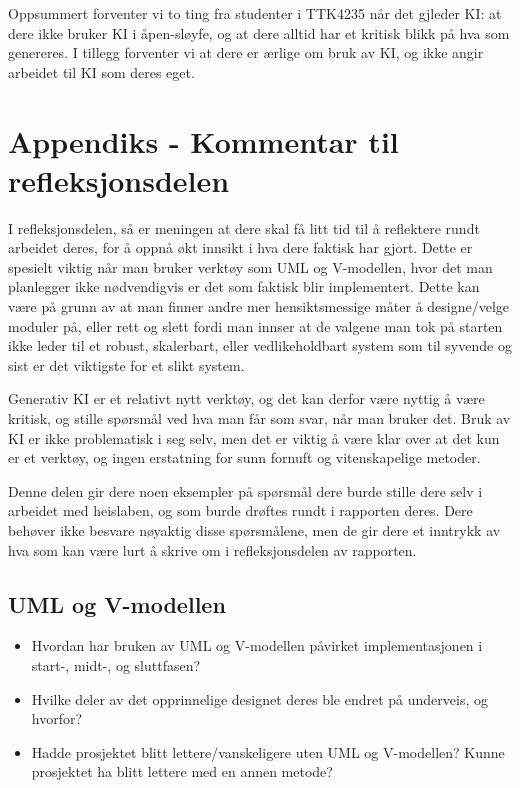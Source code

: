 Oppsummert forventer vi to ting fra studenter i TTK4235 når det gjleder KI: at dere ikke bruker KI i åpen-sløyfe, og at dere alltid har et kritisk blikk på hva som genereres. I tillegg forventer vi at dere er ærlige om bruk av KI, og ikke angir arbeidet til KI som deres eget. 

\section{Appendiks - Kommentar til refleksjonsdelen}\label{app:refleksjon}

I refleksjonsdelen, så er meningen at dere skal få litt tid til å reflektere rundt arbeidet deres, for å oppnå økt innsikt i hva dere faktisk har gjort. Dette er spesielt viktig når man bruker verktøy som UML og V-modellen, hvor det man planlegger ikke nødvendigvis er det som faktisk blir implementert. Dette kan være på grunn av at man finner andre mer hensiktsmessige måter å designe/velge moduler på, eller rett og slett fordi man innser at de valgene man tok på starten ikke leder til et robust, skalerbart, eller vedlikeholdbart system som til syvende og sist er det viktigste for et slikt system. 

Generativ KI er et relativt nytt verktøy, og det kan derfor være nyttig å være kritisk, og stille spørsmål ved hva man får som svar, når man bruker det. Bruk av KI er ikke problematisk i seg selv, men det er viktig å være klar over at det kun er et verktøy, og ingen erstatning for sunn fornuft og vitenskapelige metoder.

Denne delen gir dere noen eksempler på spørsmål dere burde stille dere selv i arbeidet med heislaben, og som burde drøftes rundt i rapporten deres. Dere behøver ikke besvare nøyaktig disse spørsmålene, men de gir dere et inntrykk av hva som kan være lurt å skrive om i refleksjonsdelen av rapporten.

\subsection{UML og V-modellen}
\begin{itemize}
    \item Hvordan har bruken av UML og V-modellen påvirket implementasjonen i start-, midt-, og sluttfasen?
    \item Hvilke deler av det opprinnelige designet deres ble endret på underveis, og hvorfor?
    \item Hadde prosjektet blitt lettere/vanskeligere uten UML og V-modellen? Kunne prosjektet ha blitt lettere med en annen metode?
\end{itemize}

